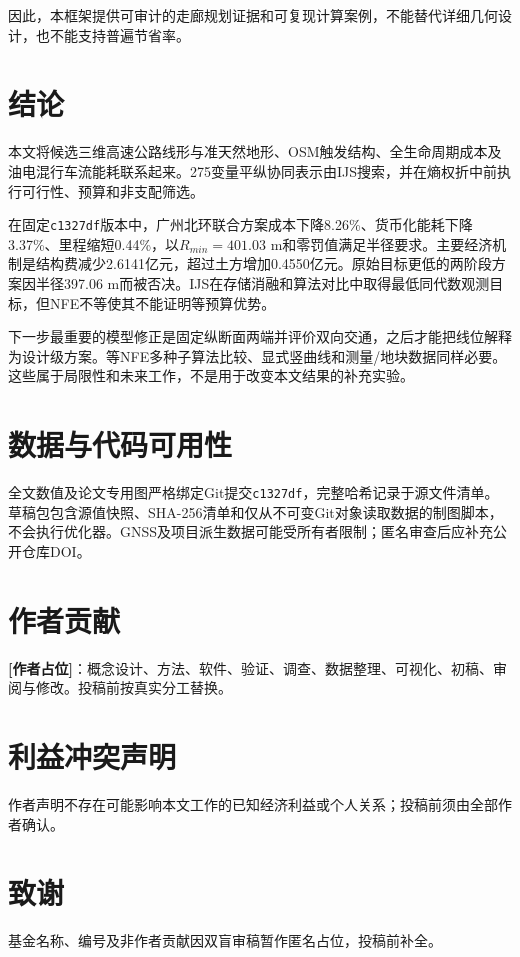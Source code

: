 \documentclass[preprint,12pt]{elsarticle}
\begin{document}
因此，本框架提供可审计的走廊规划证据和可复现计算案例，不能替代详细几何设计，也不能支持普遍节省率。

\section{结论}

本文将候选三维高速公路线形与准天然地形、OSM触发结构、全生命周期成本及油电混行车流能耗联系起来。275变量平纵协同表示由IJS搜索，并在熵权折中前执行可行性、预算和非支配筛选。

在固定\texttt{c1327df}版本中，广州北环联合方案成本下降8.26\%、货币化能耗下降3.37\%、里程缩短0.44\%，以$R_{min}=401.03$ m和零罚值满足半径要求。主要经济机制是结构费减少2.6141亿元，超过土方增加0.4550亿元。原始目标更低的两阶段方案因半径397.06 m而被否决。IJS在存储消融和算法对比中取得最低同代数观测目标，但NFE不等使其不能证明等预算优势。

下一步最重要的模型修正是固定纵断面两端并评价双向交通，之后才能把线位解释为设计级方案。等NFE多种子算法比较、显式竖曲线和测量/地块数据同样必要。这些属于局限性和未来工作，不是用于改变本文结果的补充实验。

\section*{数据与代码可用性}
全文数值及论文专用图严格绑定Git提交\texttt{c1327df}，完整哈希记录于源文件清单。草稿包包含源值快照、SHA-256清单和仅从不可变Git对象读取数据的制图脚本，不会执行优化器。GNSS及项目派生数据可能受所有者限制；匿名审查后应补充公开仓库DOI。

\section*{作者贡献}
\textbf{[作者占位]}：概念设计、方法、软件、验证、调查、数据整理、可视化、初稿、审阅与修改。投稿前按真实分工替换。

\section*{利益冲突声明}
作者声明不存在可能影响本文工作的已知经济利益或个人关系；投稿前须由全部作者确认。

\section*{致谢}
基金名称、编号及非作者贡献因双盲审稿暂作匿名占位，投稿前补全。



\end{document}
